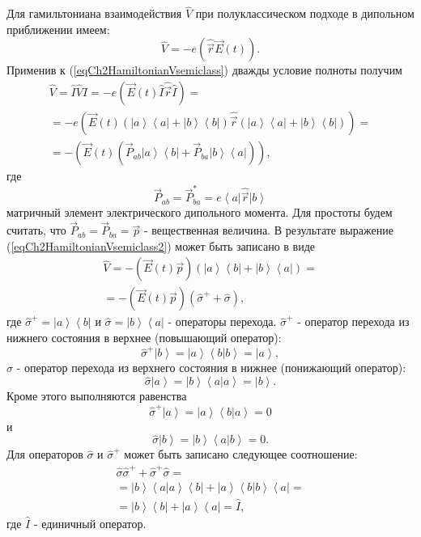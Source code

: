 Для гамильтониана взаимодействия $\hat{V}$ при полуклассическом
подходе в дипольном приближении имеем:
\begin{equation}
\hat{V} = - e \left(\hat{\vec{r}} \vec{E}\left(t\right)\right).
\label{eqCh2HamiltonianVsemiclass}
\end{equation}
Применив к (\ref{eqCh2HamiltonianVsemiclass}) дважды условие
полноты получим
\begin{eqnarray}
\hat{V} = \hat{I}\hat{V}\hat{I} = - e \left(\vec{E}\left(t\right)
\hat{I}\hat{\vec{r}}\hat{I}\right) = 
\nonumber \\
= - e \left(\vec{E}\left(t\right) 
\left(\left|a\right>\left<a\right| +
  \left|b\right>\left<b\right|\right)\hat{\vec{r}}
\left(\left|a\right>\left<a\right| +
  \left|b\right>\left<b\right|\right)\right) = 
\nonumber \\
= - \left(\vec{E}\left(t\right)
  \left(\vec{P}_{ab}\left|a\right>\left<b\right| +
    \vec{P}_{ba}\left|b\right>\left<a\right|\right)\right),
\label{eqCh2HamiltonianVsemiclass2}
\end{eqnarray}
где 
\[
\vec{P}_{ab} = \vec{P}_{ba}^{*} = e \left<a\right|\hat{\vec{r}}\left|b\right>
\]
матричный элемент электрического дипольного момента. 
Для простоты будем считать, что $\vec{P}_{ab} = \vec{P}_{ba} =
\vec{p}$ - вещественная величина. В результате выражение
(\ref{eqCh2HamiltonianVsemiclass2}) может быть записано в виде
\begin{eqnarray}
\hat{V} 
= - \left(\vec{E}\left(t\right)\vec{p}\right)
\left(
  \left|a\right>\left<b\right| +
  \left|b\right>\left<a\right|\right) = 
\nonumber \\
= - \left(\vec{E}\left(t\right)\vec{p}\right) \left(\hat{\sigma}^{+} + \hat{\sigma}\right),
\label{eqCh2HamiltonianVsemiclass3}
\end{eqnarray}
где  $\hat{\sigma}^{+} = \left|a\right>\left<b\right|$ и 
$\hat{\sigma} = \left|b\right>\left<a\right|$ 
-  операторы перехода. 
$\hat{\sigma}^{+}$ -  оператор перехода из нижнего состояния в верхнее (повышающий
оператор):
\[
\hat{\sigma}^{+} \left|b\right> = 
\left|a\right>\left<b\right|\left.b\right> = 
\left|a\right>,
\]
$\hat{\sigma}$
- оператор перехода из верхнего состояния в нижнее
(понижающий оператор):
\[
\hat{\sigma}
\left|a\right> = 
\left|b\right>\left<a\right|\left.a\right> = 
\left|b\right>.
\]
Кроме этого выполняются равенства
\[
\hat{\sigma}^{+} \left|a\right> = 
\left|a\right>\left<b\right|\left.a\right> = 
0
\]
и
\[
\hat{\sigma}
\left|b\right> = 
\left|b\right>\left<a\right|\left.b\right> = 
0.
\]
Для операторов $\hat{\sigma}$ и $\hat{\sigma}^{+}$ может быть записано
следующее соотношение: 
\begin{eqnarray}
\hat{\sigma}\hat{\sigma}^{+} + \hat{\sigma}^{+}\hat{\sigma} =
\nonumber \\
= \left|b\right>\left<a\right|\left.a\right>\left<b\right| + 
 \left|a\right>\left<b\right|\left.b\right>\left<a\right| = 
\nonumber \\
= \left|b\right>\left<b\right| + \left|a\right>\left<a\right| = \hat{I}, 
\label{eqCh2_task1}
\end{eqnarray}
где $\hat{I}$ - единичный оператор.


